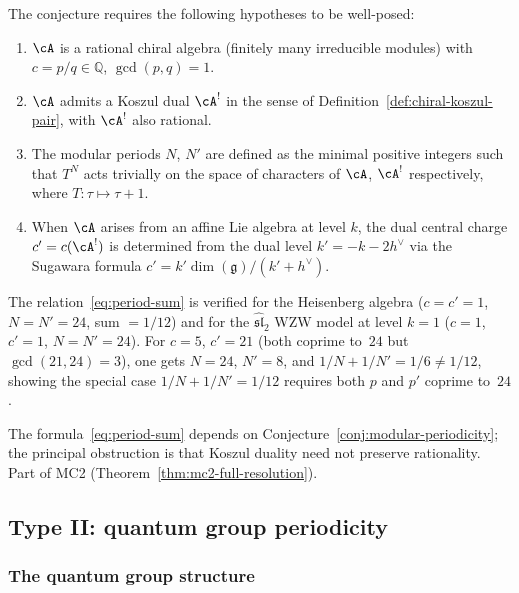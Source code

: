 \begin{remark}
\label{rem:precise-reflected-hypotheses}
The conjecture requires the following hypotheses to be well-posed:
\begin{enumerate}
\item $\cA$ is a rational chiral algebra (finitely many irreducible modules) with $c = p/q \in \mathbb{Q}$, $\gcd(p,q) = 1$.
\item $\cA$ admits a Koszul dual $\cA^!$ in the sense of Definition~\ref{def:chiral-koszul-pair}, with $\cA^!$ also rational.
\item The modular periods $N$, $N'$ are defined as the minimal positive integers such that $T^N$ acts trivially on the space of characters of $\cA$, $\cA^!$ respectively, where $T: \tau \mapsto \tau + 1$.
\item When $\cA$ arises from an affine Lie algebra at level $k$, the dual central charge $c' = c(\cA^!)$ is determined from the dual level $k' = -k - 2h^\vee$ via the Sugawara formula $c' = k'\dim(\mathfrak{g})/(k' + h^\vee)$.
\end{enumerate}
The relation~\eqref{eq:period-sum} is verified for the Heisenberg algebra ($c = c' = 1$, $N = N' = 24$, sum $= 1/12$) and for the $\widehat{\mathfrak{sl}}_2$ WZW model at level $k = 1$ ($c = 1$, $c' = 1$, $N = N' = 24$).  For $c = 5$, $c' = 21$ (both coprime to~$24$ but $\gcd(21, 24) = 3$), one gets $N = 24$, $N' = 8$, and $1/N + 1/N' = 1/6 \neq 1/12$, showing the special case $1/N + 1/N' = 1/12$ requires both $p$ and $p'$ coprime to~$24$.
\end{remark}

\begin{remark}[Scope]
The formula~\eqref{eq:period-sum} depends on Conjecture~\ref{conj:modular-periodicity}; the principal obstruction is that Koszul duality need not preserve rationality.  Part of MC2 (Theorem~\ref{thm:mc2-full-resolution}).
\end{remark}

\subsection{Type II: quantum group periodicity}

\subsubsection{The quantum group structure}

